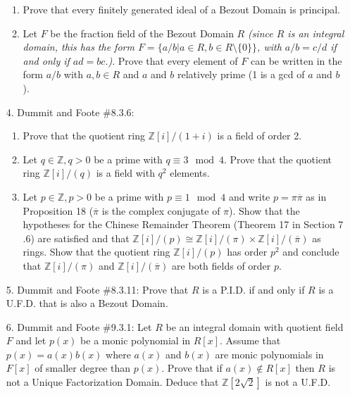 \documentclass[12pt]{article}
\newcommand{\Z}{\mathbb{Z}}
\newcommand{\ba}{\overline}
\begin{document}
\begin{enumerate}
\begin{enumerate}
    \item Prove that every finitely generated ideal of a Bezout Domain is principal.

    \item Let $F$ be the fraction field of the Bezout Domain $R$ \emph{(since $R$ is an integral domain, this has the form $F = \{a/b | a\in R, b\in R\setminus\{0\}\}$, with $a/b = c/d$ if and only if $ad = bc$.)}. Prove that every element of $F$ can be written in the form $a/b$ with $a, b\in R$ and $a$ and $b$ relatively prime (1 is a gcd of $a$ and $b$).

\end{enumerate}

\item[4.] Dummit and Foote \#8.3.6: 

\begin{enumerate}
    \item Prove that the quotient ring $\Z[i]/(1 + i)$ is a field of order 2.
    
    \item Let $q\in \Z, q>0$ be a prime with $q\equiv 3 \mod 4$. Prove that the quotient ring $\Z[i]/(q)$ is a field with $q^2$ elements.
    
    \item Let $p\in\Z, p>0$ be a prime with $p\equiv 1 \mod 4$ and write $p = \pi\ba{\pi}$  as in Proposition 18 ($\ba{\pi}$ is the complex conjugate of $\pi$). Show that the hypotheses for the Chinese Remainder Theorem (Theorem 17 in Section 7 .6) are satisfied and that $\Z[i]/(p)\cong \Z[i]/(\pi)\times \Z[i]/(\ba{\pi})$ as rings. Show that the quotient ring $\Z[i]/(p)$ has order $p^2$ and conclude that $\Z[i]/(\pi)$ and $\Z[i]/(\ba{\pi})$ are both fields of order $p$.

\end{enumerate}

\item[5.] Dummit and Foote \#8.3.11: Prove that $R$ is a P.I.D. if and only if $R$ is a U.F.D. that is
also a Bezout Domain.


\item[6.] Dummit and Foote \#9.3.1: Let $R$ be an integral domain with quotient field $F$ and let $p(x)$ be a monic polynomial in $R[x]$. Assume that $p(x) = a(x)b(x)$ where $a (x)$ and $b(x)$ are monic polynomials in $F[x]$ of smaller degree than $p(x)$. Prove that if $a(x)\notin R[x]$ then $R$ is not a Unique Factorization Domain. Deduce that $\Z[2\sqrt{2}]$ is not a U.F.D.


\end{enumerate}
\end{document}
